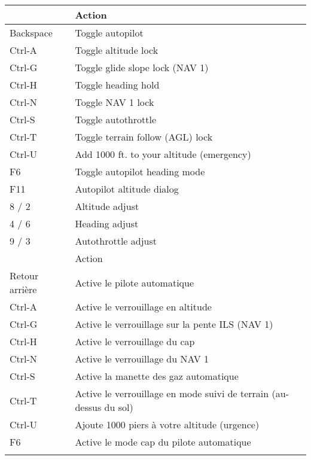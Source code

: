 \begin{tabular}{|l|l|}\hline
\IfLanguageName{english}{
 Key              &         Action\\\hline
    Backspace     &         Toggle autopilot\\
    Ctrl-A        &         Toggle altitude lock \index{altitude hold}\\
    Ctrl-G        &         Toggle glide slope lock (NAV 1)\\
    Ctrl-H        &         Toggle heading hold\index{heading hold}\\
    Ctrl-N        &         Toggle NAV 1 lock\\
    Ctrl-S        &         Toggle autothrottle\index{autothrottle}\\
    Ctrl-T        &         Toggle terrain follow (AGL) lock\\
    Ctrl-U        &         Add 1000 ft. to your altitude (emergency)\\
    F6            &         Toggle autopilot heading mode\\
    F11           &         Autopilot altitude dialog\\\hline
    8 / 2         &         Altitude adjust\\
    4 / 6         &         Heading adjust\\
    9 / 3         &         Autothrottle adjust \\\hline
}{}
\IfLanguageName{french}{
 Touche           &         Action\\\hline
    Retour arri\`{e}re     &         Active le pilote automatique\\
    Ctrl-A        &         Active le verrouillage en altitude \index{maintien d'altitude}\\
    Ctrl-G        &         Active le verrouillage sur la pente ILS (NAV 1)\\
    Ctrl-H        &         Active le verrouillage du cap \index{maintient de cap}\\
    Ctrl-N        &         Active le verrouillage du NAV 1\\
    Ctrl-S        &         Active la manette des gaz automatique\index{manette des gaz automatique}\\
    Ctrl-T        &         Active le verrouillage en mode suivi de terrain (au-dessus du sol)\\
    Ctrl-U        &         Ajoute 1000 piers \`{a} votre altitude (urgence)\\
    F6            &         Active le mode cap du pilote automatique\\
}
\end{tabular}
